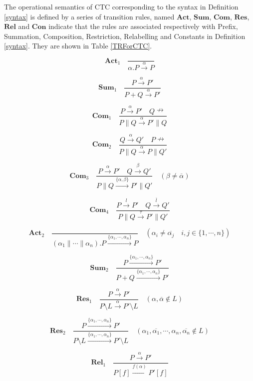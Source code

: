 \begin{definition}[Semantics]\label{semantics}
The operational semantics of CTC corresponding to the syntax in Definition \ref{syntax} is defined by a series of transition rules, named $\textbf{Act}$, $\textbf{Sum}$, $\textbf{Com}$, $\textbf{Res}$, $\textbf{Rel}$ and $\textbf{Con}$ indicate that the rules are associated respectively with Prefix, Summation, Composition, Restriction, Relabelling and Constants in Definition \ref{syntax}. They are shown in Table \ref{TRForCTC}.

\begin{center}
    \begin{table}
        \[\textbf{Act}_1\quad \frac{}{\alpha.P\xrightarrow{\alpha}P}\]

        \[\textbf{Sum}_1\quad \frac{P\xrightarrow{\alpha}P'}{P+Q\xrightarrow{\alpha}P'}\]

        \[\textbf{Com}_1\quad \frac{P\xrightarrow{\alpha}P'\quad Q\nrightarrow}{P\parallel Q\xrightarrow{\alpha}P'\parallel Q}\]

        \[\textbf{Com}_2\quad \frac{Q\xrightarrow{\alpha}Q'\quad P\nrightarrow}{P\parallel Q\xrightarrow{\alpha}P\parallel Q'}\]

        \[\textbf{Com}_3\quad \frac{P\xrightarrow{\alpha}P'\quad Q\xrightarrow{\beta}Q'}{P\parallel Q\xrightarrow{\{\alpha,\beta\}}P'\parallel Q'}\quad (\beta\neq\overline{\alpha})\]

        \[\textbf{Com}_4\quad \frac{P\xrightarrow{l}P'\quad Q\xrightarrow{\overline{l}}Q'}{P\parallel Q\xrightarrow{\tau}P'\parallel Q'}\]

        \[\textbf{Act}_2\quad \frac{}{(\alpha_1\parallel\cdots\parallel\alpha_n).P\xrightarrow{\{\alpha_1,\cdots,\alpha_n\}}P}\quad (\alpha_i\neq\overline{\alpha_j}\quad i,j\in\{1,\cdots,n\})\]

        \[\textbf{Sum}_2\quad \frac{P\xrightarrow{\{\alpha_1,\cdots,\alpha_n\}}P'}{P+Q\xrightarrow{\{\alpha_1,\cdots,\alpha_n\}}P'}\]

        \[\textbf{Res}_1\quad \frac{P\xrightarrow{\alpha}P'}{P\setminus L\xrightarrow{\alpha}P'\setminus L}\quad (\alpha,\overline{\alpha}\notin L)\]

        \[\textbf{Res}_2\quad \frac{P\xrightarrow{\{\alpha_1,\cdots,\alpha_n\}}P'}{P\setminus L\xrightarrow{\{\alpha_1,\cdots,\alpha_n\}}P'\setminus L}\quad (\alpha_1,\overline{\alpha_1},\cdots,\alpha_n,\overline{\alpha_n}\notin L)\]

        \[\textbf{Rel}_1\quad \frac{P\xrightarrow{\alpha}P'}{P[f]\xrightarrow{f(\alpha)}P'[f]}\]


\end{table}
\end{center}
\end{definition}

